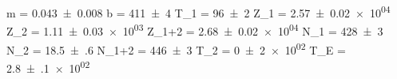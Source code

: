 m = \SI{+0.043(8)}{}{\per\second\per\volt}
b = \SI{+411(4)}{}{\per\second}
T_1 = \SI{+96(2)}{}{\micro\second}
Z_1 = \SI{+2.57(2)e+04}{}{}
Z_2 = \SI{+1.11(3)e+03}{}{}
Z_{1+2} = \SI{+2.68(2)e+04}{}{}
N_1 = \SI{+428(3)}{}{\per\second}
N_2 = \SI{+18.5(6)}{}{\per\second}
N_{1+2} = \SI{+446(3)}{}{\per\second}
T_2 = \SI{+0(2)e+02}{}{\micro\second}
T_E = \SI{+2.8(1)e+02}{}{\micro\second}
